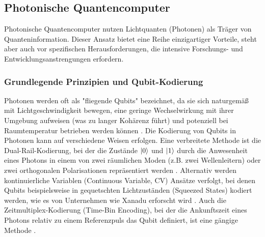 \subsection{Photonische Quantencomputer}
Photonische Quantencomputer nutzen Lichtquanten (Photonen) als Träger von Quanteninformation. Dieser Ansatz bietet eine Reihe einzigartiger Vorteile, steht aber auch vor spezifischen Herausforderungen, die intensive Forschungs- und Entwicklungsanstrengungen erfordern.

\subsubsection{Grundlegende Prinzipien und Qubit-Kodierung}
Photonen werden oft als "fliegende Qubits" bezeichnet, da sie sich naturgemäß mit Lichtgeschwindigkeit bewegen, eine geringe Wechselwirkung mit ihrer Umgebung aufweisen (was zu langer Kohärenz führt) und potenziell bei Raumtemperatur betrieben werden können \cite{abughanemPhotonicQuantumComputers2024}. Die Kodierung von Qubits in Photonen kann auf verschiedene Weisen erfolgen. Eine verbreitete Methode ist die Dual-Rail-Kodierung, bei der die Zustände $\ket{0}$ und $\ket{1}$ durch die Anwesenheit eines Photons in einem von zwei räumlichen Moden (z.B. zwei Wellenleitern) oder zwei orthogonalen Polarisationen repräsentiert werden \cite{slussarenkoPhotonicQuantumInformation2019}. Alternativ werden kontinuierliche Variablen (Continuous Variable, CV) Ansätze verfolgt, bei denen Qubits beispielsweise in gequetschten Lichtzuständen (Squeezed States) kodiert werden, wie es von Unternehmen wie Xanadu erforscht wird \cite{QuantumComputingArchitecture}. Auch die Zeitmultiplex-Kodierung (Time-Bin Encoding), bei der die Ankunftszeit eines Photons relativ zu einem Referenzpuls das Qubit definiert, ist eine gängige Methode \cite{LinearOpticsScalable}.

